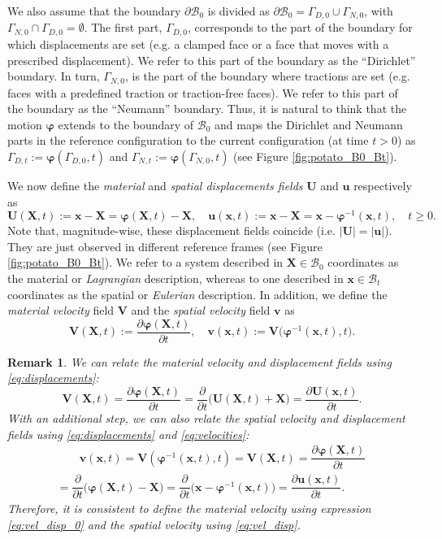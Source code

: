 \documentclass{sfuthesis}
\numberwithin{equation}{section}
\numberwithin{figure}{chapter}
\numberwithin{table}{chapter}
\newtheorem{remark}[theorem]{Remark}
\theoremstyle{definition}
\def\*#1{{\mathbf{#1}}} %
\newcommand{\pder}[2]{\dfrac{\partial #1}{\partial #2}}
\newcommand{\B}{\mathcal{B}}
\def\bphi{{\bm{\varphi}}}
\begin{document}
We also assume that the boundary $\partial \B_0$ is divided as $\partial \B_0 = \Gamma_{D,0} \cup \Gamma_{N,0}$, with $\Gamma_{N,0} \cap \Gamma_{D,0} = \emptyset$. The first part, $\Gamma_{D,0}$, corresponds to the part of the boundary for which displacements are set (e.g. a clamped face or a face that moves with a prescribed displacement). We refer to this part of the boundary as the ``Dirichlet'' boundary. In turn, $\Gamma_{N,0}$, is the part of the boundary where tractions are set (e.g. faces with a predefined traction or traction-free faces). We refer to this part of the boundary as the ``Neumann'' boundary. Thus, it is natural to think that the motion $\bphi$ extends to the boundary of $\B_0$ and maps the Dirichlet and Neumann parts in the reference configuration to the current configuration (at time $t>0$) as $\Gamma_{D,t} := \bphi(\Gamma_{D,0}, t)$ and $\Gamma_{N,t} := \bphi(\Gamma_{N,0}, t)$ (see Figure \ref{fig:potato_B0_Bt}).

We now define the \textit{material} and \textit{spatial displacements fields} $\*U$ and $\*u$ respectively as
\begin{equation}\label{eq:displacements}
\*U(\*X,t) := \*x - \*X = \bphi(\*X,t) - \*X, \quad \*u(\*x,t) := \*x - \*X = \*x - \bphi^{-1}(\*x,t), \quad t \geq 0.
\end{equation}
Note that, magnitude-wise, these displacement fields coincide (i.e. $|\*U|=|\*u|$). They are just observed in different reference frames (see Figure \ref{fig:potato_B0_Bt}). We refer to a system described in $\*X \in \B_0$ coordinates as the material or \textit{Lagrangian} description, whereas to one described in $\*x \in \B_t$ coordinates as the spatial or \textit{Eulerian} description. In addition, we define the \textit{material velocity} field $\*V$ and the \textit{spatial velocity} field $\*v$ as
\begin{equation}\label{eq:velocities}
\*V(\*X,t) := \pder{\bphi(\*X,t)}{t}, \quad \*v(\*x,t) := \*V\big(\bphi^{-1}(\*x,t), t\big).
\end{equation}

\begin{remark} \label{re:velocity_def}
We can relate the material velocity and displacement fields using \eqref{eq:displacements}:
\begin{equation} \label{eq:vel_disp_0}
\*V(\*X,t) = \pder{\bphi(\*X,t)}{t} = \pder{}{t}\Big( \*U(\*X,t) + \*X \Big) = \pder{\*U(\*x,t)}{t}.
\end{equation}
With an additional step, we can also relate the spatial velocity and displacement fields using \eqref{eq:displacements} and \eqref{eq:velocities}:
\begin{multline} \label{eq:vel_disp}
\qquad \*v(\*x,t) = \*V(\bphi^{-1}(\*x,t),t) = \*V(\*X,t) = \pder{\bphi(\*X,t)}{t} \\
= \pder{}{t} \Big( \bphi(\*X,t) - \*X \Big) = \pder{}{t} \Big(\*x - \bphi^{-1}(\*x,t) \Big) = \pder{\*u(\*x,t)}{t}. \qquad 
\end{multline}
Therefore, it is consistent to define the material velocity using expression  \eqref{eq:vel_disp_0} and the spatial velocity using \eqref{eq:vel_disp}.
\end{remark}
\end{document}
